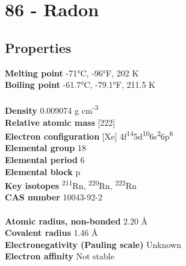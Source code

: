 \section{86 - Radon}
\label{sec:elem-radon}
\subsection{Properties}
\textbf{Melting point} -71°C, -96°F, 202 K\\
\textbf{Boiling point} -61.7°C, -79.1°F, 211.5 K\\
\\
\textbf{Density} 0.009074 g cm\textsuperscript{-3}\\
\textbf{Relative atomic mass} [222]\\
\textbf{Electron configuration} [Xe] 4f\textsuperscript{14}5d\textsuperscript{10}6s\textsuperscript{2}6p\textsuperscript{6}\\
\textbf{Elemental group} 18\\
\textbf{Elemental period} 6\\
\textbf{Elemental block} p\\
\textbf{Key isotopes} \textsuperscript{211}Rn, \textsuperscript{220}Rn, \textsuperscript{222}Rn\\
\textbf{CAS number} 10043-92-2\\
\\
\textbf{Atomic radius, non-bonded} 2.20 Å\\
\textbf{Covalent radius} 1.46 Å\\
\textbf{Electronegativity (Pauling scale)} Unknown\\
\textbf{Electron affinity} Not stable\\